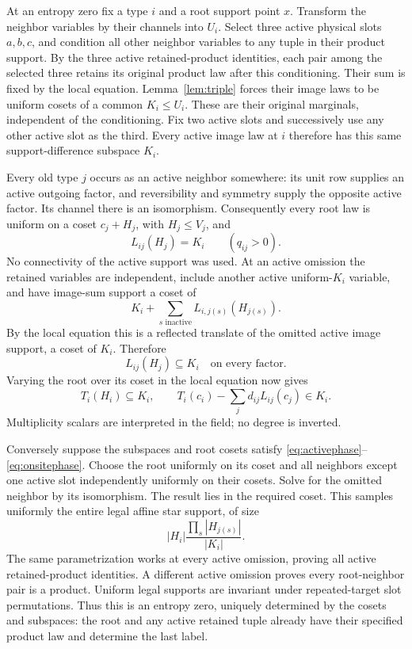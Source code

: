 \documentclass[11pt]{article}
\begin{document}
At an entropy zero fix a type $i$ and a root support point $x$. Transform the neighbor variables by their channels into $U_i$. Select three active physical slots $a,b,c$, and condition all other neighbor variables to any tuple in their product support. By the three active retained-product identities, each pair among the selected three retains its original product law after this conditioning. Their sum is fixed by the local equation. Lemma~\ref{lem:triple} forces their image laws to be uniform cosets of a common $K_i\le U_i$. These are their original marginals, independent of the conditioning. Fix two active slots and successively use any other active slot as the third. Every active image law at $i$ therefore has this same support-difference subspace $K_i$.

Every old type $j$ occurs as an active neighbor somewhere: its unit row supplies an active outgoing factor, and reversibility and symmetry supply the opposite active factor. Its channel there is an isomorphism. Consequently every root law is uniform on a coset $c_j+H_j$, with $H_j\le V_j$, and
\begin{equation}\label{eq:activephase}
 L_{ij}(H_j)=K_i\qquad(q_{ij}>0).
\end{equation}
No connectivity of the active support was used. At an active omission the retained variables are independent, include another active uniform-$K_i$ variable, and have image-sum support a coset of
\[
 K_i+\sum_{s\text{ inactive}}L_{i,j(s)}(H_{j(s)}).
\]
By the local equation this is a reflected translate of the omitted active image support, a coset of $K_i$. Therefore
\begin{equation}\label{eq:inactivephase}
 L_{ij}(H_j)\subseteq K_i\quad\text{on every factor}.
\end{equation}
Varying the root over its coset in the local equation now gives
\begin{equation}\label{eq:onsitephase}
 T_i(H_i)\subseteq K_i,\qquad
 T_i(c_i)-\sum_jd_{ij}L_{ij}(c_j)\in K_i.
\end{equation}
Multiplicity scalars are interpreted in the field; no degree is inverted.

Conversely suppose the subspaces and root cosets satisfy \eqref{eq:activephase}--\eqref{eq:onsitephase}. Choose the root uniformly on its coset and all neighbors except one active slot independently uniformly on their cosets. Solve for the omitted neighbor by its isomorphism. The result lies in the required coset. This samples uniformly the entire legal affine star support, of size
\[
 |H_i|\frac{\prod_s|H_{j(s)}|}{|K_i|}.
\]
The same parametrization works at every active omission, proving all active retained-product identities. A different active omission proves every root-neighbor pair is a product. Uniform legal supports are invariant under repeated-target slot permutations. Thus this is an entropy zero, uniquely determined by the cosets and subspaces: the root and any active retained tuple already have their specified product law and determine the last label.
\end{document}
